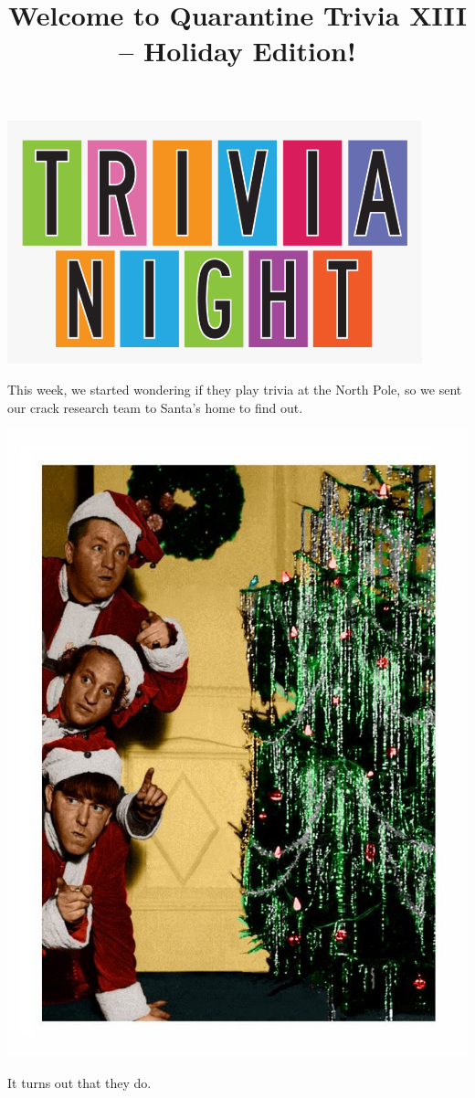 \documentclass[11pt]{beamer}
\begin{document}
\title{Welcome to Quarantine Trivia XIII -- Holiday Edition!}
\date{}

\begin{frame}
    \titlepage{}
    \begin{center}
        \includegraphics[max width=0.9\textwidth,
            max height=0.4\textheight]{Images/triviatitleframelogo.png}
    \end{center}
\end{frame}
\begin{frame}
    This week, we started wondering if they play trivia at the North Pole, so we sent our
    crack research team to Santa's home to find out.
    \pause
    \begin{center}
        \includegraphics[max width=.95\textwidth,
            max height=0.55\textheight]{Images/stoogesxmas.jpg}
    \end{center}
    \pause
    It turns out that they do.
\end{frame}
\end{document}
